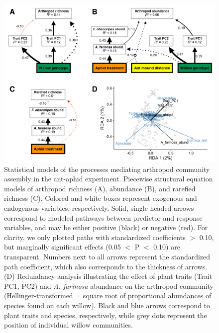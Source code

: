\documentclass[11pt]{article}
\begin{document}
\begin{figure}[h!]
\centering
\includegraphics[scale = 0.45]{image04.png}
\caption{Statistical models of the processes mediating
arthropod community assembly in the ant-aphid experiment. Piecewise
structural equation models of arthropod richness (A), abundance (B), and
rarefied richness (C). Colored and white boxes represent exogenous and
endogenous variables, respectively. Solid, single-headed arrows
correspond to modeled pathways between predictor and response variables,
and may be either positive (black) or negative (red). For clarity,
we only plotted paths with standardized coefficients $>$
0.10, but marginally significant effects (0.05 $<$ P $<$ 0.10) are transparent. Numbers next to all arrows represent the standardized path
coefficient, which also corresponds to the thickness of arrows. (D)
Redundancy analysis illustrating the effect of plant traits (Trait PC1, PC2) and \textit{A. farinosa} abundance on the arthropod community (Hellinger-transformed = square root of proportional abundances of species found on each willow).
Black and blue arrows correspond to plant traits and species,
respectively, while grey dots represent the position of individual
willow communities.}
\label{aaSEM}
\end{figure}
\end{document}
